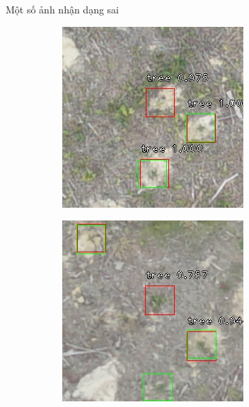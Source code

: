 \documentclass[a4paper, 12pt]{report}
\begin{document}
Một số ảnh nhận dạng sai
\begin{figure}[!h]
    \centering
    \begin{subfigure}[!h]{0.45\textwidth}
    \includegraphics[width=\linewidth]{Images/detect_fail/Img_RSKA003603_0_r2304_c3584}
        \label{fig:subfig1}
    \end{subfigure}%
    \quad
    \begin{subfigure}[!h]{0.45\textwidth}
    \includegraphics[width=\linewidth]{Images/detect_fail/Img_RSKA003603_0_r2176_c1024}

\end{subfigure}
\end{figure}
\end{document}
